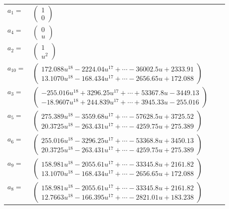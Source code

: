 \documentclass[1p]{elsarticle_modified}
\theoremstyle{definition}
\begin{document}
\begin{tabular}{m{7pt} m{180pt} m{7pt} m{180pt} }
\flushright $a_{1}=$&$\begin{pmatrix}1\\0\end{pmatrix}$ \\
\flushright $a_{4}=$&$\begin{pmatrix}0\\u\end{pmatrix}$ \\
\flushright $a_{2}=$&$\begin{pmatrix}1\\u^2\end{pmatrix}$ \\
\flushright $a_{10}=$&$\begin{pmatrix}172.088 u^{18}-2224.04 u^{17}+\cdots-36002.5 u+2333.91\\13.1070 u^{18}-168.434 u^{17}+\cdots-2656.65 u+172.088\end{pmatrix}$ \\
\flushright $a_{3}=$&$\begin{pmatrix}-255.016 u^{18}+3296.25 u^{17}+\cdots+53367.8 u-3449.13\\-18.9607 u^{18}+244.839 u^{17}+\cdots+3945.33 u-255.016\end{pmatrix}$ \\
\flushright $a_{5}=$&$\begin{pmatrix}275.389 u^{18}-3559.68 u^{17}+\cdots-57628.5 u+3725.52\\20.3725 u^{18}-263.431 u^{17}+\cdots-4259.75 u+275.389\end{pmatrix}$ \\
\flushright $a_{6}=$&$\begin{pmatrix}255.016 u^{18}-3296.25 u^{17}+\cdots-53368.8 u+3450.13\\20.3725 u^{18}-263.431 u^{17}+\cdots-4259.75 u+275.389\end{pmatrix}$ \\
\flushright $a_{9}=$&$\begin{pmatrix}158.981 u^{18}-2055.61 u^{17}+\cdots-33345.8 u+2161.82\\13.1070 u^{18}-168.434 u^{17}+\cdots-2656.65 u+172.088\end{pmatrix}$ \\
\flushright $a_{8}=$&$\begin{pmatrix}158.981 u^{18}-2055.61 u^{17}+\cdots-33345.8 u+2161.82\\12.7663 u^{18}-166.395 u^{17}+\cdots-2821.01 u+183.238\end{pmatrix}$ \\

\end{tabular}
\end{document}
